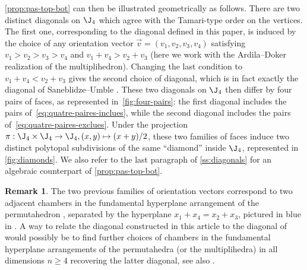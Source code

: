 \documentclass[JEP,XML,SOM,NoFloatCountersInSection,Unicode,published]{cedram}
\def\mto{\mathchoice{\longmapsto}{\mapsto}{\mapsto}{\mapsto}}
\theoremstyle{definition}
\newtheorem{remark}[definition]{\sc Remark}
\theoremstyle{plain}
\begin{document}
\cref{prop:pas-top-bot} can then be illustrated geometrically as follows.
There are two distinct diagonals on $\J_4$ which agree with the Tamari-type order on the vertices.
The first one, corresponding to the diagonal defined in this paper, is induced by the choice of any orientation vector $\vec v=(v_1,v_2,v_3,v_4)$ satisfying $v_1>v_2>v_3>v_4$ and $v_1 + v_4 > v_2+v_3$ (here we work with the Ardila--Doker realization of the multiplihedron).
Changing the last condition to $v_1 + v_4 < v_2+v_3$ gives the second choice of diagonal, which is in fact exactly the diagonal of Saneblidze--Umble \cite[\S 5]{SaneblidzeUmble04}.
These two diagonals on $\J_4$ then differ by four pairs of faces, as represented in~\cref{fig:four-pairs}: the first diagonal includes the pairs of~\eqref{eq:quatre-paires-inclues}, while the second diagonal includes the pairs of~\eqref{eq:quatre-paires-exclues}.
Under the projection $\pi : \J_4 \times \J_4 \to \J_4, (x,y) \mto (x+y)/2$, these two families of faces induce two distinct polytopal subdivisions of the same ``diamond'' inside $\J_4$, represented in \cref{fig:diamonds}.
We also refer to the last paragraph of \cref{ss:diagonals} for an algebraic counterpart of \cref{prop:pas-top-bot}.

\begin{remark}
The two previous families of orientation vectors correspond to two adjacent chambers in the fundamental hyperplane arrangement of the permutahedron \cite[Th.\,3.6]{LA21}, separated by the hyperplane $x_1+x_4=x_2+x_3$, pictured in blue in \cite[Fig.\,12]{LA21}.
A way to relate the diagonal constructed in this article to the diagonal of \cite[\S 5]{SaneblidzeUmble04} would possibly be to find further choices of chambers in the fundamental hyperplane arrangements of the permutahedra (or the multiplihedra) in all dimensions $n \geq 4$ recovering the latter diagonal, see also \cite[Rem.\,3.19]{LA21}.
\end{remark}
\end{document}
